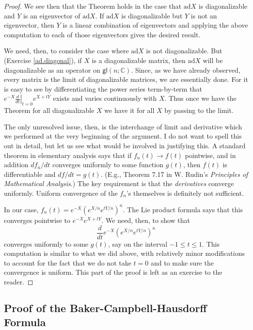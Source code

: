 \documentclass{amsbook}
\theoremstyle{plain}
\numberwithin{equation}{chapter}
\numberwithin{theorem}{chapter}
\begin{document}
\begin{proof}
We see then that the Theorem holds in the case that $\mathrm{ad}X$ is
diagonalizable and $Y$ is an eigenvector of $\mathrm{ad}X$. If $\mathrm{ad}X$
is diagonalizable but $Y$ is not an eigenvector, then $Y$ is a linear
combination of eigenvectors and applying the above computation to each of
those eigenvectors gives the desired result.

We need, then, to consider the case where $\mathrm{ad}X$ is not
diagonalizable. But (Exercise \ref{ad.diagonal}), if $X$ is a diagonalizable
matrix, then $\mathrm{ad}X$ will be diagonalizable as an operator on
$\mathsf{gl}(n;\mathbb{C})$. Since, as we have already observed, every matrix
is the limit of diagonalizable matrices, we are essentially done. For it is
easy to see by differentiating the power series term-by-term that
$e^{-X}\left.  \tfrac{d}{dt}\right|  _{t=0}e^{X+tY}$ exists and varies
continuously with $X$. Thus once we have the Theorem for all diagonalizable
$X$ we have it for all $X$ by passing to the limit.

The only unresolved issue, then, is the interchange of limit and derivative
which we performed at the very beginning of the argument. I do not want to
spell this out in detail, but let us see what would be involved in justifying
this. A standard theorem in elementary analysis says that if $f_{n}%
(t)\rightarrow f(t)$ pointwise, and in addition $df_{n}/dt$ converges
uniformly to some function $g(t)$, then $f(t)$ is differentiable and
$df/dt=g(t)$. (E.g., Theorem 7.17 in W. Rudin's \textit{Principles of
Mathematical Analysis}.) The key requirement is that the \textit{derivatives}
converge uniformly. Uniform convergence of the $f_{n}$'s themselves is
definitely not sufficient.

In our case, $f_{n}(t)=e^{-X}\left(  e^{X/n}e^{tY/n}\right)  ^{n}$. The Lie
product formula says that this converges pointwise to $e^{-X}e^{X+tY}$. We
need, then, to show that
\[
\frac{d}{dt}e^{-X}\left(  e^{X/n}e^{tY/n}\right)  ^{n}%
\]
converges uniformly to some $g(t)$, say on the interval $-1\leq t\leq1$. This
computation is similar to what we did above, with relatively minor
modifications to account for the fact that we do not take $t=0$ and to make
sure the convergence is uniform. This part of the proof is left as an exercise
to the reader.
\end{proof}

\subsection{Proof of the Baker-Campbell-Hausdorff Formula}
\end{document}

